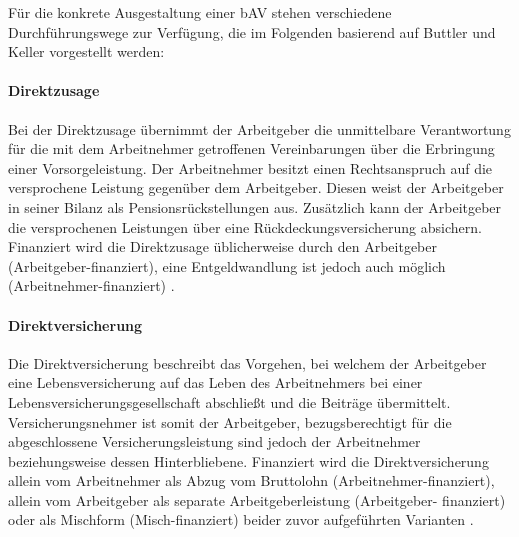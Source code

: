Für die konkrete Ausgestaltung einer bAV stehen verschiedene Durchführungswege zur Verfügung, die im Folgenden basierend auf Buttler und Keller \cite{buttler2017einfuehrung} vorgestellt werden:

\paragraph*{Direktzusage}
Bei der Direktzusage übernimmt der Arbeitgeber die unmittelbare Verantwortung für die mit dem Arbeitnehmer getroffenen Vereinbarungen über die Erbringung einer Vorsorgeleistung. Der Arbeitnehmer besitzt einen Rechtsanspruch auf die versprochene Leistung gegenüber dem Arbeitgeber. Diesen weist der Arbeitgeber in seiner Bilanz als Pensionsrückstellungen aus. Zusätzlich kann der Arbeitgeber die versprochenen Leistungen über eine Rückdeckungsversicherung absichern. Finanziert wird die Direktzusage üblicherweise durch den Arbeitgeber (Arbeitgeber-finanziert), eine Entgeldwandlung ist jedoch auch möglich (Arbeitnehmer-finanziert) \cite[S. 140]{buttler2017einfuehrung}.

\paragraph*{Direktversicherung}

Die Direktversicherung beschreibt das Vorgehen, bei welchem der Arbeitgeber eine Lebensversicherung auf das Leben des Arbeitnehmers bei einer Lebensversicherungsgesellschaft abschließt und die Beiträge übermittelt. Versicherungsnehmer ist somit der Arbeitgeber, bezugsberechtigt für die abgeschlossene Versicherungsleistung sind jedoch der Arbeitnehmer beziehungsweise dessen Hinterbliebene. Finanziert wird die Direktversicherung allein vom Arbeitnehmer als Abzug vom Bruttolohn (Arbeitnehmer-finanziert), allein vom Arbeitgeber als separate Arbeitgeberleistung (Arbeitgeber- finanziert) oder als Mischform (Misch-finanziert) beider zuvor aufgeführten Varianten \cite[S. 33]{plato2016betriebliche}.

